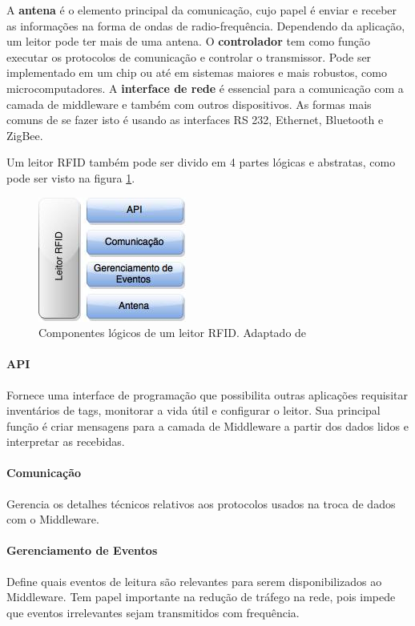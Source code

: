	A \textbf{antena} é o elemento principal da comunicação, cujo papel é enviar e receber as informações na forma de ondas de radio-frequência. Dependendo da aplicação, um leitor pode ter mais de uma antena. O \textbf{controlador} tem como função executar os protocolos de comunicação e controlar o transmissor. Pode ser implementado em um chip ou até em sistemas maiores e mais robustos, como microcomputadores. A \textbf{interface de rede} é essencial para a comunicação com a camada de middleware e também com outros dispositivos. As formas mais comuns de se fazer isto é usando as interfaces RS 232, Ethernet, Bluetooth e ZigBee.
	
	Um leitor RFID também pode ser divido em 4 partes lógicas e abstratas, como pode ser visto na figura \ref{fig:reader}. 
		
		\begin{figure}[h!]
			\centering
			\includegraphics[width=0.25\linewidth]{reader}
			\caption{Componentes lógicos de um leitor RFID. Adaptado de \cite{rfidbook}}
			\label{fig:reader}
		\end{figure}
	
	\paragraph{API} Fornece uma interface de programação que possibilita outras aplicações requisitar inventários de tags, monitorar a vida útil e configurar o leitor. Sua principal função é criar mensagens para a camada de Middleware a partir dos dados lidos e interpretar as recebidas.
	
	\paragraph{Comunicação} Gerencia os detalhes técnicos relativos aos protocolos usados na troca de dados com o Middleware.
	
	\paragraph{Gerenciamento de Eventos} Define quais eventos de leitura são relevantes para serem disponibilizados ao Middleware. Tem papel importante na redução de tráfego na rede, pois impede que eventos irrelevantes sejam transmitidos com frequência.
	
